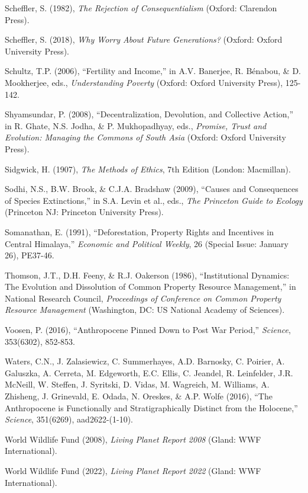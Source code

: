 \documentclass[man,11pt,a4paper,floatsintext]{apa7}
\begin{document}
\begin{list}{}{\setlength{\leftmargin}{0.5in}\setlength{\itemindent}{-0.5in}\setlength{\itemsep}{0pt}\setlength{\parsep}{0pt}}
\item Scheffler, S. (1982), \textit{The Rejection of Consequentialism} (Oxford: Clarendon Press).
\item Scheffler, S. (2018), \textit{Why Worry About Future Generations?} (Oxford: Oxford University Press).
\item Schultz, T.P. (2006), ``Fertility and Income,'' in A.V. Banerjee, R. B\'enabou, \& D. Mookherjee, eds., \textit{Understanding Poverty} (Oxford: Oxford University Press), 125-142.
\item Shyamsundar, P. (2008), ``Decentralization, Devolution, and Collective Action,'' in R. Ghate, N.S. Jodha, \& P. Mukhopadhyay, eds., \textit{Promise, Trust and Evolution: Managing the Commons of South Asia} (Oxford: Oxford University Press).
\item Sidgwick, H. (1907), \textit{The Methods of Ethics}, 7th Edition (London: Macmillan).
\item Sodhi, N.S., B.W. Brook, \& C.J.A. Bradshaw (2009), ``Causes and Consequences of Species Extinctions,'' in S.A. Levin et al., eds., \textit{The Princeton Guide to Ecology} (Princeton NJ: Princeton University Press).
\item Somanathan, E. (1991), ``Deforestation, Property Rights and Incentives in Central Himalaya,'' \textit{Economic and Political Weekly}, 26 (Special Issue: January 26), PE37-46.
\item Thomson, J.T., D.H. Feeny, \& R.J. Oakerson (1986), ``Institutional Dynamics: The Evolution and Dissolution of Common Property Resource Management,'' in National Research Council, \textit{Proceedings of Conference on Common Property Resource Management} (Washington, DC: US National Academy of Sciences).
\item Voosen, P. (2016), ``Anthropocene Pinned Down to Post War Period,'' \textit{Science}, 353(6302), 852-853.
\item Waters, C.N., J. Zalasiewicz, C. Summerhayes, A.D. Barnosky, C. Poirier, A. Galuszka, A. Cerreta, M. Edgeworth, E.C. Ellis, C. Jeandel, R. Leinfelder, J.R. McNeill, W. Steffen, J. Syritski, D. Vidas, M. Wagreich, M. Williams, A. Zhisheng, J. Grinevald, E. Odada, N. Oreskes, \& A.P. Wolfe (2016), ``The Anthropocene is Functionally and Stratigraphically Distinct from the Holocene,'' \textit{Science}, 351(6269), aad2622-(1-10).
\item World Wildlife Fund (2008), \textit{Living Planet Report 2008} (Gland: WWF International).
\item World Wildlife Fund (2022), \textit{Living Planet Report 2022} (Gland: WWF International).
\end{list}
\end{document}
